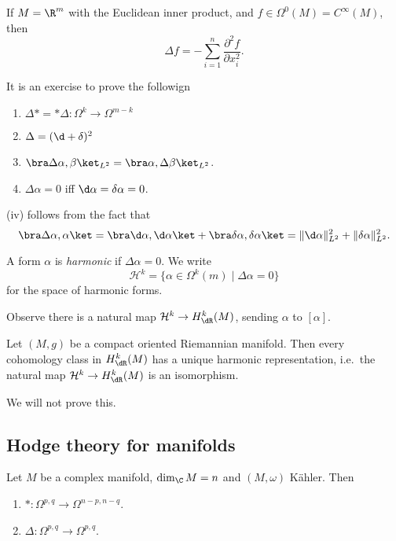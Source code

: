 \documentclass[a4paper]{article}
\begin{document}
\begin{eg}
  If $M = \R^m$ with the Euclidean inner product, and $f \in \Omega^0(M) = C^\infty(M)$, then
  \[
    \Delta f = - \sum_{i = 1}^n \frac{\partial^2 f}{\partial x_i^2}.
  \]
\end{eg}

It is an exercise to prove the followign
\begin{prop}\leavevmode
  \begin{enumerate}
    \item $\Delta * = *\Delta: \Omega^k \to \Omega^{m - k}$
    \item $\Delta = (\d + \delta)^2$
    \item $\bra \Delta \alpha, \beta\ket_{L^2} = \bra \alpha, \Delta \beta\ket_{L^2}$.
    \item $\Delta \alpha = 0$ iff $\d \alpha = \delta \alpha = 0$.\fakeqed
  \end{enumerate}
\end{prop}
(iv) follows from the fact that
\[
  \bra \Delta \alpha, \alpha\ket = \bra \d \alpha, \d \alpha\ket + \bra \delta \alpha, \delta \alpha\ket = \|\d \alpha\|_{L^2}^2 + \|\delta \alpha\|_{L^2}^2.
\]
\begin{defi}
  A form $\alpha$ is \emph{harmonic} if $\Delta \alpha = 0$. We write
  \[
    \mathcal{H}^k = \{\alpha \in \Omega^k(m) \mid \Delta \alpha = 0\}
  \]
  for the space of harmonic forms.
\end{defi}
Observe there is a natural map $\mathcal{H}^k \to H^k_{\dR}(M)$, sending $\alpha$ to $[\alpha]$.
\begin{thm}
  Let $(M, g)$ be a compact oriented Riemannian manifold. Then every cohomology class in $H_{\dR}^k(M)$ has a unique harmonic representation, i.e.\ the natural map $\mathcal{H} ^k \to H_{\dR}^k(M)$ is an isomorphism.\qedhere
\end{thm}
We will not prove this.

\subsection{Hodge theory for  manifolds} %
\begin{prop}
  Let $M$ be a complex manifold, $\dim_\C M = n$ and $(M, \omega)$ K\"ahler. Then
  \begin{enumerate}
    \item $*: \Omega^{p, q} \to \Omega^{n - p, n - q}$.
    \item $\Delta: \Omega^{p, q} \to \Omega^{p, q}$.
  \end{enumerate}
\end{prop}
\end{document}
